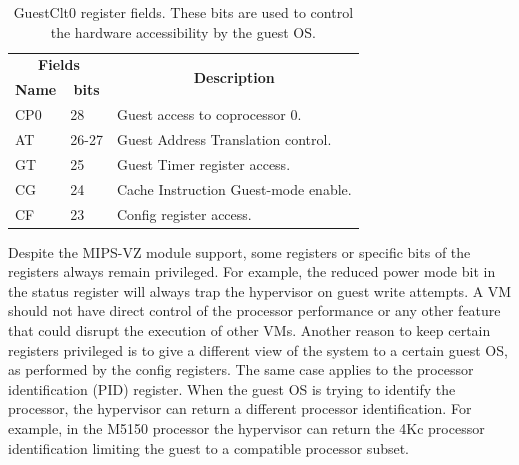 \begin{table}[!hbtp]
\centering
\caption{GuestClt0 register fields. These bits are used to control the hardware accessibility by the guest OS.}
\label{table5:guestctl0}
\begin{tabular}{lll}
\hline
\hline
\multicolumn{2}{c}{\textbf{Fields}}                                   & \multicolumn{1}{c}{\multirow{2}{*}{\textbf{Description}}} \\ %
\multicolumn{1}{c}{\textbf{Name}} & \multicolumn{1}{c}{\textbf{bits}} & \multicolumn{1}{c}{}                                      \\ \hline 
CP0                               & 28                                & Guest access to coprocessor 0.                            \\
AT                                & 26-27                             & Guest Address Translation control.                        \\
GT                                & 25                                & Guest Timer register access.                              \\
CG                                & 24                                & Cache Instruction Guest-mode enable.                      \\
CF                                & 23                                & Config register access.                                   \\ \hline
\end{tabular}
\end{table}


Despite the MIPS-VZ module support, some registers or specific bits of the registers always remain privileged. For example, the reduced power mode bit in the status register will always trap the hypervisor on guest write attempts. A VM should not have direct control of the processor performance or any other feature that could disrupt the execution of other VMs. Another reason to keep certain registers privileged is to give a different view of the system to a certain guest OS, as performed by the config registers. The same case applies to the processor identification (PID) register. When the guest OS is trying to identify the processor, the hypervisor can return a different processor identification. For example, in the M5150 processor the hypervisor can return the 4Kc processor identification limiting the guest to a compatible processor subset. %

